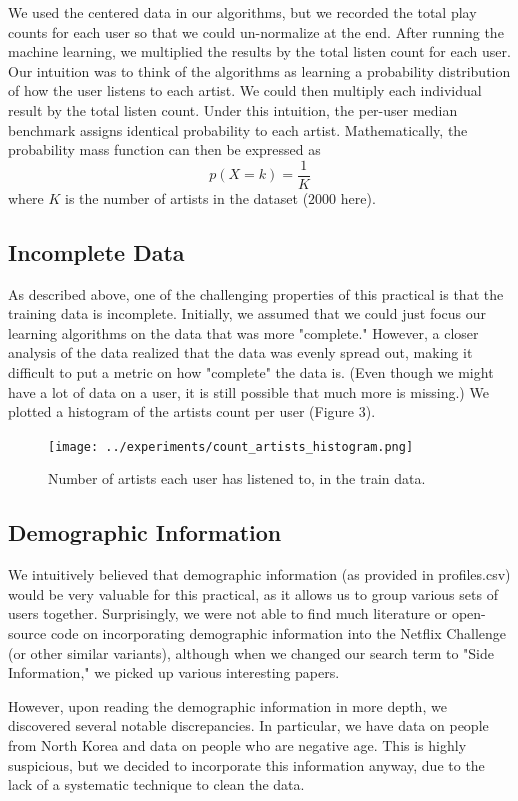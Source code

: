 \documentclass[10pt]{article}
\begin{document}
We used the centered data in our algorithms, but we recorded the total play counts for each user so that we could un-normalize at the end. After running the machine learning, we multiplied the results by the total listen count for each user. Our intuition was to think of the algorithms as learning a probability distribution of how the user listens to each artist. We could then multiply each individual result by the total listen count. Under this intuition, the per-user median benchmark assigns identical probability to each artist. Mathematically, the probability mass function can then be expressed as
$$p(X = k) = \frac{1}{K}$$
where $K$ is the number of artists in the dataset ($2000$ here).  

\subsection{Incomplete Data}
As described above, one of the challenging properties of this practical is that the training data is incomplete. Initially, we assumed that we could just focus our learning algorithms on the data that was more "complete." However, a closer analysis of the data realized that the data was evenly spread out, making it difficult to put a metric on how "complete" the data is. (Even though we might have a lot of data on a user, it is still possible that much more is missing.) We plotted a histogram of the artists count per user (Figure 3).

\begin{figure}[h]
\centering
\texttt{[image: ../experiments/count\_artists\_histogram.png]}
\caption{Number of artists each user has listened to, in the train data.}
\label{fig:img3}
\end{figure}

\subsection{Demographic Information}
We intuitively believed that demographic information (as provided in profiles.csv) would be very valuable for this practical, as it allows us to group various sets of users together. Surprisingly, we were not able to find much literature or open-source code on incorporating demographic information into the Netflix Challenge (or other similar variants), although when we changed our search term to "Side Information," we picked up various interesting papers.

However, upon reading the demographic information in more depth, we discovered several notable discrepancies. In particular, we have data on people from North Korea and data on people who are negative age. This is highly suspicious, but we decided to incorporate this information anyway, due to the lack of a systematic technique to clean the data.
\end{document}
